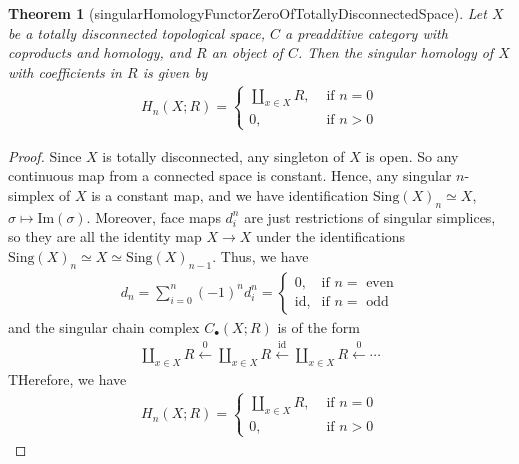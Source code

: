 \documentclass{article}
\newtheorem{theorem}{Theorem}
\begin{document}
\begin{theorem}[singularHomologyFunctorZeroOfTotallyDisconnectedSpace]
    Let $X$ be a totally disconnected topological space, $C$ a preadditive category with coproducts and homology, and $R$ an object of $C$. Then the singular homology of $X$ with coefficients in $R$ is given by
    \begin{align*}
        H_n(X;R) = \begin{cases}
            \coprod_{x \in X} R, &\text{ if }n = 0\\
            0, &\text{ if } n > 0
        \end{cases} 
    \end{align*}
\end{theorem}
\begin{proof}
    Since $X$ is totally disconnected, any singleton of $X$ is open. So any continuous map from a connected space is constant. Hence, any singular $n$-simplex of $X$ is a constant map, and we have identification $\text{Sing}(X)_n \simeq X$, $\sigma \mapsto \text{Im}(\sigma)$. Moreover, face maps $d_i^n$ are just restrictions of singular simplices, so they are all the identity map $X \to X$ under the identifications $\text{Sing}(X)_n \simeq X \simeq \text{Sing}(X)_{n-1}$. Thus, we have
    \begin{align*}
        d_n = \sum_{i=0}^n (-1)^nd_i^n = \begin{cases}
            0, &\text{if } n= \text{ even} \\
            \text{id}, &\text{if } n= \text{ odd}
        \end{cases}
    \end{align*}
    and the singular chain complex $C_\bullet(X;R)$ is of the form
    \begin{align*}
        \coprod_{x \in X} R \xleftarrow{0} \coprod_{x \in X} R \xleftarrow{\text{id}} \coprod_{x \in X} R \xleftarrow{0} \cdots
    \end{align*}
    THerefore, we have
    \begin{align*}
        H_n(X;R) = \begin{cases}
            \coprod_{x \in X} R, &\text{ if }n = 0\\
            0, &\text{ if } n > 0
        \end{cases} 
    \end{align*}
\end{proof}
\end{document}
